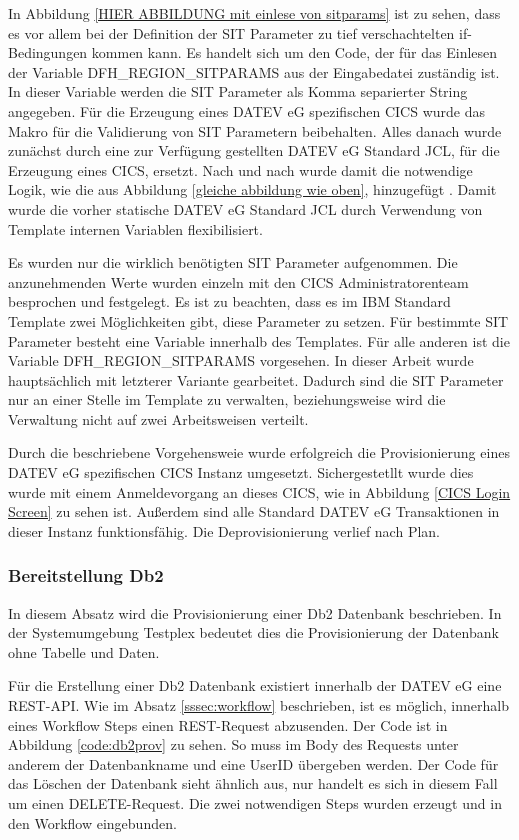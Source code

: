 In Abbildung \ref{HIER ABBILDUNG mit einlese von sitparams} ist zu sehen, dass es vor allem bei der Definition der SIT Parameter zu tief verschachtelten if-Bedingungen kommen kann.
Es handelt sich um den Code, der für das Einlesen der Variable \glqq DFH\_REGION\_SITPARAMS\grqq{} aus der Eingabedatei zuständig ist.
In dieser Variable werden die SIT Parameter als Komma separierter String angegeben.
Für die Erzeugung eines DATEV eG spezifischen CICS wurde das Makro für die Validierung von SIT Parametern beibehalten.
Alles danach wurde zunächst durch eine zur Verfügung gestellten DATEV eG Standard JCL, für die Erzeugung eines CICS, ersetzt.
Nach und nach wurde damit die notwendige Logik, wie die aus Abbildung \ref{gleiche abbildung wie oben}, hinzugefügt .
Damit wurde die vorher statische DATEV eG Standard JCL durch Verwendung von Template internen Variablen flexibilisiert.

Es wurden nur die wirklich benötigten SIT Parameter aufgenommen.
Die anzunehmenden Werte wurden einzeln mit den CICS Administratorenteam besprochen und festgelegt.
Es ist zu beachten, dass es im IBM Standard Template zwei Möglichkeiten gibt, diese Parameter zu setzen.
Für bestimmte SIT Parameter besteht eine Variable innerhalb des Templates.
Für alle anderen ist die Variable \glqq DFH\_REGION\_SITPARAMS\grqq{} vorgesehen.
In dieser Arbeit wurde hauptsächlich mit letzterer Variante gearbeitet.
Dadurch sind die SIT Parameter nur an einer Stelle im Template zu verwalten, beziehungsweise wird die Verwaltung  nicht auf zwei Arbeitsweisen verteilt.

Durch die beschriebene Vorgehensweie wurde erfolgreich die Provisionierung eines DATEV eG spezifischen CICS Instanz umgesetzt.
Sichergestetllt wurde dies wurde mit einem Anmeldevorgang an dieses CICS, wie in Abbildung \ref{CICS Login Screen} zu sehen ist.
Außerdem sind alle Standard DATEV eG Transaktionen in dieser Instanz funktionsfähig.
Die Deprovisionierung verlief nach Plan.

\subsubsection{Bereitstellung Db2}\label{sssec:db2tpl}
In diesem Absatz wird die Provisionierung einer Db2 Datenbank beschrieben.
In der Systemumgebung Testplex bedeutet dies die Provisionierung der Datenbank ohne Tabelle und Daten.

Für die Erstellung einer Db2 Datenbank existiert innerhalb der DATEV eG eine REST-API.
Wie im Absatz \ref{sssec:workflow} beschrieben, ist es möglich, innerhalb eines Workflow Steps einen REST-Request abzusenden.
Der Code ist in Abbildung \ref{code:db2prov} zu sehen.
So muss im Body des Requests unter anderem der Datenbankname und eine UserID übergeben werden.
Der Code für das Löschen der Datenbank sieht ähnlich aus, nur handelt es sich in diesem Fall um einen DELETE-Request.
Die zwei notwendigen Steps wurden erzeugt und in den Workflow eingebunden.

